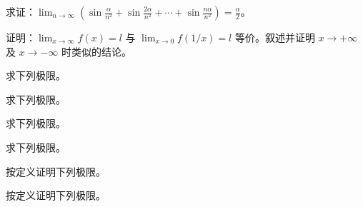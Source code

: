 \noindent\begin{minipage}{\textwidth}
求证：$\displaystyle\lim_{n\to\infty}\left(\sin\frac\alpha{n^2}+\sin\frac{2\alpha}{n^2}+\cdots+\sin\frac{n\alpha}{n^2}\right)=\frac\alpha2$。
\end{minipage}\par\vfill
\noindent\begin{minipage}{\textwidth}
证明：$\displaystyle\lim_{x\to\infty}f(x)=l$ 与 $\displaystyle\lim_{x\to0}f(1/x)=l$ 等价。叙述并证明 $x\to+\infty$ 及 $x\to-\infty$ 时类似的结论。
\end{minipage}\par\vfill
\newpage
\noindent\begin{minipage}{\textwidth}
求下列极限。
\end{minipage}\par\vfill
\noindent\begin{minipage}{\textwidth}
求下列极限。
\end{minipage}\par\vfill
\noindent\begin{minipage}{\textwidth}
求下列极限。
\end{minipage}\par\vfill
\noindent\begin{minipage}{\textwidth}
求下列极限。
\end{minipage}\par\vfill
\newpage
\noindent\begin{minipage}{\textwidth}
按定义证明下列极限。
\end{minipage}\par\vfill
\noindent\begin{minipage}{\textwidth}
按定义证明下列极限。
\end{minipage}\par\vfill
